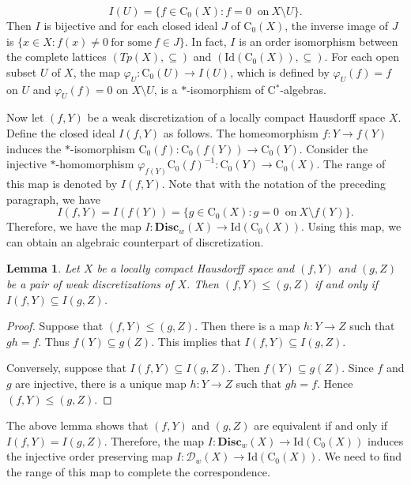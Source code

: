 \documentclass[manuscript]{amsart}
\newtheorem{lemma}[theorem]{Lemma}
\theoremstyle{definition}
\begin{document}
 \[
 I(U)=\{f\in \mathrm{C}_{0}(X) : f=0\  \text{ on}\  X\setminus U\}.
\]
 Then $I$ is bijective and for each closed ideal $J$ of $\mathrm{C}_{0}(X)$,
 the inverse image of $J$ is $\{x\in X : f(x)\neq 0\ \text{for some}\ f\in J\}$.
In fact, $I$ is an order isomorphism between the complete lattices $(Tp(X),\subseteq)$
and $(\mathrm{Id}(\mathrm{C}_{0}(X)), \subseteq)$.
For each open subset
 $U$ of $X$, the map
 $\varphi_{U}:\mathrm{C}_{0}(U)\to I(U)$, which is defined by $\varphi_{U}(f)=f$ on $U$
 and $\varphi_{U}(f)=0$ on $X\setminus U$, is a $*$-isomorphism of C$^*$-algebras.

 Now let $(f,Y)$ be a weak discretization of a  locally compact Hausdorff space $X$.
 Define the closed ideal $I(f,Y)$ as follows.
The homeomorphism $f:Y\to f(Y)$ induces the $*$-isomorphism
$\mathrm{C}_{0}(f):\mathrm{C}_{0}(f(Y))\to \mathrm{C}_{0}(Y)$.
Consider the injective $*$-homomorphism
$\varphi_{f(Y)}\mathrm{C}_{0}(f)^{-1}:\mathrm{C}_{0}(Y) \to  \mathrm{C}_{0}(X)$.
The range of this map is denoted by $I(f,Y)$.
Note that with the notation of the preceding paragraph, we have
\[
I(f,Y)=I(f(Y))=\{g\in \mathrm{C}_{0}(X) : g=0\  \text{ on}\  X\setminus f(Y)\}.
\]
Therefore, we have the map $I: \mathbf{Disc}_{w}(X)\to \mathrm{Id}( \mathrm{C}_{0}(X))$.
Using this map, we can obtain an algebraic counterpart of discretization.
\begin{lemma}\label{lemdisc}
Let $X$ be a locally compact Hausdorff space and
$(f,Y)$ and $(g,Z)$ be a pair of weak discretizations of $X$.
Then $(f,Y)\leq (g,Z)$ if and only if $I(f,Y)\subseteq I(g,Z)$.
\end{lemma}
\begin{proof}
Suppose that $(f,Y)\leq (g,Z)$. Then there is a map
$h:Y\to Z$ such that $gh=f$.
Thus $f(Y)\subseteq g(Z)$. This implies that $I(f,Y)\subseteq I(g,Z)$.

Conversely, suppose that $I(f,Y)\subseteq I(g,Z)$.
Then $f(Y)\subseteq g(Z)$.
Since $f$ and $g$ are injective,
 there is a unique map $h:Y\to Z$ such that $gh=f$.
 Hence $(f,Y)\leq (g,Z)$.
\end{proof}
The above lemma shows that
$(f,Y)$ and $(g,Z)$ are equivalent if and only if $I(f,Y)=I(g,Z)$. Therefore,
the map $I: \mathbf{Disc}_{w}(X)\to \mathrm{Id}( \mathrm{C}_{0}(X))$ induces
the injective order preserving map $I: \mathcal{D}_{w}(X)\to \mathrm{Id}( \mathrm{C}_{0}(X))$.
We need to find the range of this map to complete the correspondence.
\end{document}
